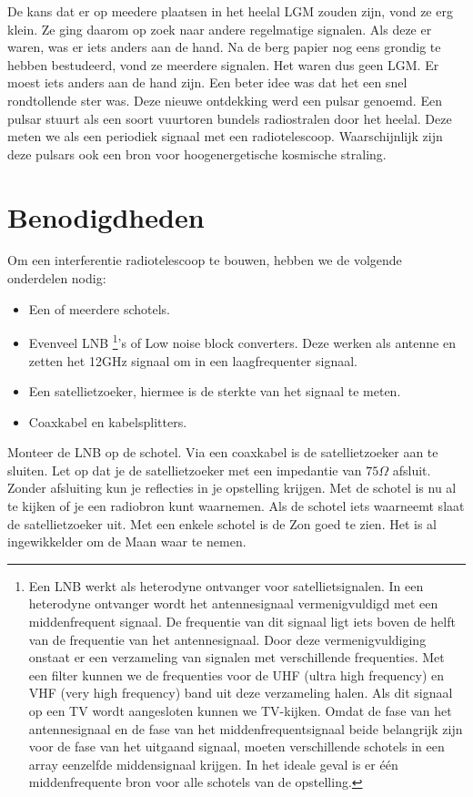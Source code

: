 De kans dat er op meedere plaatsen in het heelal LGM zouden zijn,
vond ze erg klein. Ze ging daarom op zoek naar andere regelmatige
signalen. Als deze er waren, was er iets anders aan de hand. Na de
berg papier nog eens grondig te hebben bestudeerd, vond ze meerdere
signalen. Het waren dus geen LGM. Er moest iets anders aan de hand
zijn. Een beter idee was dat het een snel rondtollende ster was. Deze
nieuwe ontdekking werd een pulsar genoemd. Een pulsar stuurt als een
soort vuurtoren bundels radiostralen door het heelal. Deze meten we
als een periodiek signaal met een radiotelescoop. Waarschijnlijk zijn
deze pulsars ook een bron voor hoogenergetische kosmische straling. 


\section{Benodigdheden}

Om een interferentie radiotelescoop te bouwen, hebben we de volgende
onderdelen nodig:
\begin{itemize}
\item Een of meerdere schotels.
\item Evenveel LNB \footnote{Een LNB werkt als heterodyne ontvanger voor
satellietsignalen. In een heterodyne ontvanger wordt het antennesignaal
vermenigvuldigd met een middenfrequent signaal. De frequentie van dit
signaal ligt iets boven de helft van de frequentie van het
antennesignaal. Door deze vermenigvuldiging onstaat er een verzameling
van signalen met verschillende frequenties. Met een filter kunnen we de
frequenties voor de UHF (ultra high frequency) en VHF (very high
frequency) band uit deze verzameling halen. Als dit signaal op een TV
wordt aangesloten kunnen we TV-kijken. Omdat de fase van het
antennesignaal en de fase van het middenfrequentsignaal beide belangrijk
zijn voor de fase van het uitgaand signaal, moeten verschillende
schotels in een array eenzelfde middensignaal krijgen. In het ideale
geval is er één middenfrequente bron voor alle schotels van de
opstelling.}'s of Low noise block converters. Deze werken als antenne en
zetten het 12GHz signaal om in een laagfrequenter signaal.
\item Een satellietzoeker, hiermee is de sterkte van het signaal te meten.
\item Coaxkabel en kabelsplitters.
\end{itemize}
Monteer de LNB op de schotel. Via een coaxkabel is de satellietzoeker
aan te sluiten. Let op dat je de satellietzoeker met een impedantie
van $75\Omega$ afsluit. Zonder afsluiting kun je reflecties in je
opstelling krijgen. Met de schotel is nu al te kijken of je een radiobron
kunt waarnemen. Als de schotel iets waarneemt slaat de satellietzoeker
uit. Met een enkele schotel is de Zon goed te zien. Het is al ingewikkelder
om de Maan waar te nemen.


